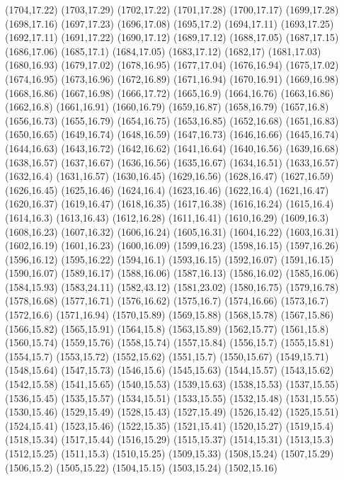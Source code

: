 (1704,17.22)
(1703,17.29)
(1702,17.22)
(1701,17.28)
(1700,17.17)
(1699,17.28)
(1698,17.16)
(1697,17.23)
(1696,17.08)
(1695,17.2)
(1694,17.11)
(1693,17.25)
(1692,17.11)
(1691,17.22)
(1690,17.12)
(1689,17.12)
(1688,17.05)
(1687,17.15)
(1686,17.06)
(1685,17.1)
(1684,17.05)
(1683,17.12)
(1682,17)
(1681,17.03)
(1680,16.93)
(1679,17.02)
(1678,16.95)
(1677,17.04)
(1676,16.94)
(1675,17.02)
(1674,16.95)
(1673,16.96)
(1672,16.89)
(1671,16.94)
(1670,16.91)
(1669,16.98)
(1668,16.86)
(1667,16.98)
(1666,17.72)
(1665,16.9)
(1664,16.76)
(1663,16.86)
(1662,16.8)
(1661,16.91)
(1660,16.79)
(1659,16.87)
(1658,16.79)
(1657,16.8)
(1656,16.73)
(1655,16.79)
(1654,16.75)
(1653,16.85)
(1652,16.68)
(1651,16.83)
(1650,16.65)
(1649,16.74)
(1648,16.59)
(1647,16.73)
(1646,16.66)
(1645,16.74)
(1644,16.63)
(1643,16.72)
(1642,16.62)
(1641,16.64)
(1640,16.56)
(1639,16.68)
(1638,16.57)
(1637,16.67)
(1636,16.56)
(1635,16.67)
(1634,16.51)
(1633,16.57)
(1632,16.4)
(1631,16.57)
(1630,16.45)
(1629,16.56)
(1628,16.47)
(1627,16.59)
(1626,16.45)
(1625,16.46)
(1624,16.4)
(1623,16.46)
(1622,16.4)
(1621,16.47)
(1620,16.37)
(1619,16.47)
(1618,16.35)
(1617,16.38)
(1616,16.24)
(1615,16.4)
(1614,16.3)
(1613,16.43)
(1612,16.28)
(1611,16.41)
(1610,16.29)
(1609,16.3)
(1608,16.23)
(1607,16.32)
(1606,16.24)
(1605,16.31)
(1604,16.22)
(1603,16.31)
(1602,16.19)
(1601,16.23)
(1600,16.09)
(1599,16.23)
(1598,16.15)
(1597,16.26)
(1596,16.12)
(1595,16.22)
(1594,16.1)
(1593,16.15)
(1592,16.07)
(1591,16.15)
(1590,16.07)
(1589,16.17)
(1588,16.06)
(1587,16.13)
(1586,16.02)
(1585,16.06)
(1584,15.93)
(1583,24.11)
(1582,43.12)
(1581,23.02)
(1580,16.75)
(1579,16.78)
(1578,16.68)
(1577,16.71)
(1576,16.62)
(1575,16.7)
(1574,16.66)
(1573,16.7)
(1572,16.6)
(1571,16.94)
(1570,15.89)
(1569,15.88)
(1568,15.78)
(1567,15.86)
(1566,15.82)
(1565,15.91)
(1564,15.8)
(1563,15.89)
(1562,15.77)
(1561,15.8)
(1560,15.74)
(1559,15.76)
(1558,15.74)
(1557,15.84)
(1556,15.7)
(1555,15.81)
(1554,15.7)
(1553,15.72)
(1552,15.62)
(1551,15.7)
(1550,15.67)
(1549,15.71)
(1548,15.64)
(1547,15.73)
(1546,15.6)
(1545,15.63)
(1544,15.57)
(1543,15.62)
(1542,15.58)
(1541,15.65)
(1540,15.53)
(1539,15.63)
(1538,15.53)
(1537,15.55)
(1536,15.45)
(1535,15.57)
(1534,15.51)
(1533,15.55)
(1532,15.48)
(1531,15.55)
(1530,15.46)
(1529,15.49)
(1528,15.43)
(1527,15.49)
(1526,15.42)
(1525,15.51)
(1524,15.41)
(1523,15.46)
(1522,15.35)
(1521,15.41)
(1520,15.27)
(1519,15.4)
(1518,15.34)
(1517,15.44)
(1516,15.29)
(1515,15.37)
(1514,15.31)
(1513,15.3)
(1512,15.25)
(1511,15.3)
(1510,15.25)
(1509,15.33)
(1508,15.24)
(1507,15.29)
(1506,15.2)
(1505,15.22)
(1504,15.15)
(1503,15.24)
(1502,15.16)
